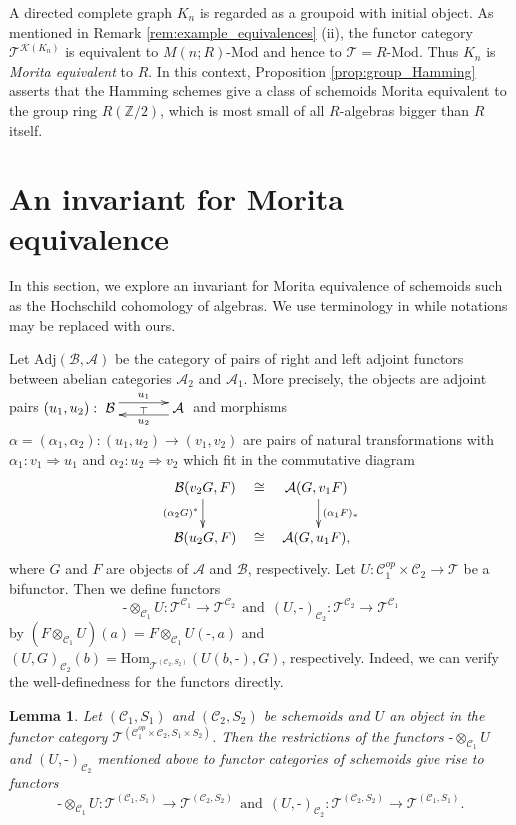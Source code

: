 \documentclass{amsart}
\newtheorem{lem}[thm]{Lemma}
\theoremstyle{definition}
\theoremstyle{remark}
\newcommand{\C}{{\mathcal C}}
\newcommand{\T}{{\mathcal T}}
\newcommand{\calK}{{\mathcal K}}
\begin{document}
A directed complete graph $K_n$ is regarded as a groupoid with initial object. As mentioned in Remark 
\ref{rem:example_equivalences} (ii), the functor category $\T^{\calK(K_n)}$ is equivalent to $M(n; R)\text{-Mod}$ and hence 
to $\T=R\text{-Mod}$. Thus $K_n$ is {\it Morita equivalent} to $R$. In this context, 
Proposition \ref{prop:group_Hamming} asserts that the Hamming schemes give a class of schemoids Morita equivalent to 
the group ring $R({\mathbb Z}/2)$, which is most small of all $R$-algebras bigger than $R$ itself. 

\section{An invariant for Morita equivalence}

In this section, we explore an invariant for Morita equivalence of schemoids such as the Hochschild cohomology of algebras.
We use terminology in \cite{P-N} while notations may be replaced with ours.  

Let $\text{Adj}({\mathcal B}, {\mathcal A})$ be the category of pairs of right and left adjoint functors between abelian categories 
${\mathcal A}_2$ and  ${\mathcal A}_1$. More precisely, the objects are adjoint pairs $(u_1, u_2) : 
\xymatrix@C35pt@R25pt{
{\mathcal B} \ar@<1ex>[r]^-{u_1}_-{\top} 
& {\mathcal A} \ar@<1ex>[l]^-{u_2}  }
$
and morphisms $\alpha=(\alpha_1, \alpha_2) : (u_1, u_2) \to (v_1, v_2)$ are pairs of natural transformations with 
$\alpha_1 : v_1 \Rightarrow u_1$ and $\alpha_2: u_2 \Rightarrow v_2$ which fit 
in the commutative diagram
$$
\xymatrix@C10pt@R20pt{
{\mathcal B}(v_2G, F) \ar[d]_{(\alpha_2G)^*}  \!\!& \cong  & \!\! {\mathcal A}(G, v_1F) \ar[d]^{(\alpha_1F)_*} \\
{\mathcal B}(u_2G, F)  \!\!& \cong & \!\! {\mathcal A}(G, u_1F), 
}
$$
where $G$ and $F$ are objects of ${\mathcal A}$ and ${\mathcal B}$, respectively. 
Let $U : \C_1^{op}\times \C_2 \to \T$ be a bifunctor. Then we define functors
$$\text{-}\otimes_{\C_1}U : \T^{\C_1} \to \T^{\C_2} \ \ \text{and} \ \
(U, \text{-})_{\C_2} : \T^{\C_2} \to \T^{\C_1}$$ by 
$(F\otimes_{\C_1}U)(a)= F\otimes_{\C_1}U(\text{-}, a)$ and $(U, G)_{\C_2}(b)= \text{Hom}_{\T^{(\C_2, S_2)}}(U(b, \text{-}), G)$, respectively. Indeed, we can verify the well-definedness for the functors directly. 
 
 
\begin{lem} Let $(\C_1, S_1)$ and $(\C_2, S_2)$ be schemoids and $U$ an object 
in the functor category $\T^{(\C_1^{op}\times \C_2, S_1 \times S_2)}$.  
Then the restrictions of the functors  $\text{-}\otimes_{\C_1}U$ and $(U, \text{-})_{\C_2}$ mentioned above to functor 
categories of schemoids give rise to functors 
$$\text{-}\otimes_{\C_1}U : \T^{(\C_1, S_1)} \to \T^{(\C_2, S_2)} \ \ \text{and} \ \
(U, \text{-})_{\C_2} : \T^{(\C_2, S_2)} \to \T^{(\C_1, S_1)}.$$ 
\end{lem} 
\end{document}
